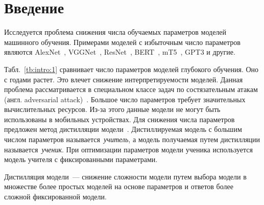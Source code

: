 \documentclass[12pt]{a&t}
\begin{document}
\section{Введение}
Исследуется проблема снижения числа обучаемых параметров моделей машинного обучения. Примерами моделей с избыточным число параметров являются AlexNet~\cite{Krizhevsky2012}, VGGNet~\cite{Simonyan2014}, ResNet~\cite{Kaiming2015}, BERT~\cite{Devlin2018, Vaswani2017}, mT5~\cite{Linting2021}, GPT3\cite{Brown2020} и другие.
\begin{table}[h!]
\caption{Число параметров в моделях машинного обучения.}
\label{tb:intro:1}
\begin{center}
\end{center}
\end{table}
Табл.~\ref{tb:intro:1} сравнивает число параметров моделей глубокого обучения.
Оно с годами растет.
Это влечет снижение интерпретируемости моделей.
Данная проблема рассматривается в специальном классе задач по состязательным атакам (англ. adversarial attack)~\cite{Zheng2020}.
Большое число параметров требует значительных вычислительных ресурсов.
Из-за этого данные модели не могут быть использованы в мобильных устройствах.
Для снижения числа параметров предложен метод дистилляции модели~\cite{Hinton2015, Vapnik2015, Lopez2016}.
Дистиллируемая модель с большим числом параметров называется~\textit{учитель}, а модель получаемая путем дистилляции называется~\textit{ученик}.
При оптимизации параметров модели ученика используется модель учителя с фиксированными параметрами.
\begin{definition}
Дистилляция модели~--- снижение сложности модели путем выбора модели в множестве более простых моделей на основе параметров и ответов более сложной фиксированной модели.
\end{definition}
\end{document}
